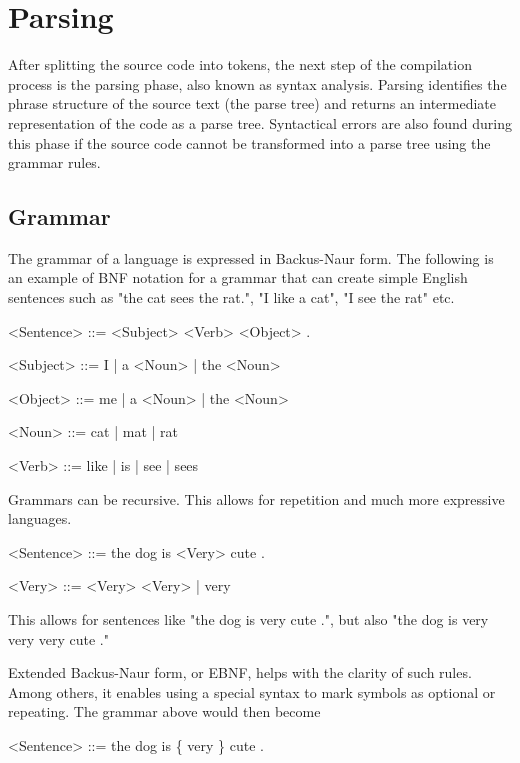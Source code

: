 \section{Parsing}
\label{background:parsing}

After splitting the source code into tokens, the next step of the compilation process is the parsing phase, also known as syntax analysis. Parsing identifies the phrase structure of the source text (the parse tree) and returns an intermediate representation of the code as a parse tree. Syntactical errors are also found during this phase if the source code cannot be transformed into a parse tree using the grammar rules.

\subsection{Grammar}

The grammar of a language is expressed in Backus-Naur form. The following is an example of BNF notation for a grammar that can create simple English sentences such as "the cat sees the rat.", "I like a cat", "I see the rat" etc.

\begin{grammar}
<Sentence> ::= <Subject> <Verb> <Object> .

<Subject> ::= I | a <Noun> | the <Noun>

<Object> ::= me | a <Noun> | the <Noun>

<Noun> ::= cat | mat | rat

<Verb> ::= like | is | see | sees 
\end{grammar}

Grammars can be recursive. This allows for repetition and much more expressive languages.

\begin{grammar}
<Sentence> ::= the dog is <Very> cute .

<Very> ::= <Very> <Very> | very
\end{grammar}

This allows for sentences like "the dog is very cute .", but also "the dog is very very very cute ."

Extended Backus-Naur form, or EBNF, helps with the clarity of such rules. Among others, it enables using a special syntax to mark symbols as optional or repeating. The grammar above would then become 

\begin{grammar}
<Sentence> ::= the dog is \{ very \} cute .
\end{grammar}


